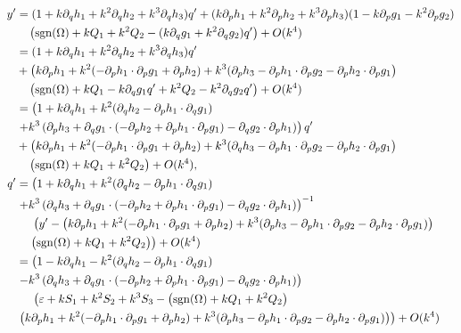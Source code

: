 \documentclass[../main]{subfiles}
\begin{document}
    \begin{align}
        y'&=(1+k\partial_q h_1+k^2\partial_q h_2+k^3\partial_q h_3)q'+(k\pt_p h_1+k^2\pt_p h_2+k^3\pt_p h_3)(1-k\pt_p g_1-k^2\pt_p g_2)\notag\\
        &\quad\left(\operatorname{sgn}(\Omega)+kQ_1+k^2 Q_2-(k\pt_q g_1+k^2\pt_q g_2)q'\right)+O(k^4)\\
        &=(1+k\partial_q h_1+k^2\partial_q h_2+k^3\partial_q h_3)q'\notag\\
        &+\left(k\pt_p h_1+k^2(-\pt_p h_1\cdot \pt_p g_1+\pt_p h_2)+k^3(\pt_p h_3-\pt_p h_1\cdot\pt_p g_2-\pt_p h_2\cdot \pt_p g_1\right)\notag\\
        &\quad\left(\operatorname{sgn}(\Omega)+kQ_1-k\pt_q g_1q'+k^2Q_2-k^2\pt_q g_2q'\right)+O(k^4)\\
        &=\left(1+k\partial_q h_1+k^2(\partial_q h_2-\pt_p h_1\cdot \pt_q g_1)\right.\notag\\
        &\left.+k^3\left(\pt_p h_3+\pt_qg_1\cdot(-\pt_ph_2+\pt_ph_1\cdot\pt_pg_1)-\pt_qg_2\cdot\pt_ph_1\right)\right)q'\notag\\
        &+\left(k\pt_p h_1+k^2(-\pt_p h_1\cdot \pt_p g_1+\pt_p h_2)+k^3(\pt_q h_3-\pt_p h_1\cdot\pt_p g_2-\pt_p h_2\cdot \pt_p g_1\right)\notag\\
        &\quad\left(\operatorname{sgn}(\Omega)+kQ_1+k^2Q_2\right)+O(k^4),\\
        q'&=\left(1+k\partial_q h_1+k^2(\partial_q h_2-\pt_p h_1\cdot \pt_q g_1)\right.\notag\\
        &\left.+k^3\left(\pt_q h_3+\pt_qg_1\cdot(-\pt_ph_2+\pt_ph_1\cdot\pt_pg_1)-\pt_qg_2\cdot\pt_ph_1\right)\right)^{-1}\notag\\
        &\quad\ \left(y'-\left(k\pt_p h_1+k^2(-\pt_p h_1\cdot \pt_p g_1+\pt_p h_2)+k^3(\pt_p h_3-\pt_p h_1\cdot\pt_p g_2-\pt_p h_2\cdot \pt_p g_1)\right)\right.\notag\\
        &\quad\left. \left(\operatorname{sgn}(\Omega)+kQ_1+k^2Q_2\right)\right)+O(k^4)\\
        &=\left(1-k\partial_q h_1-k^2(\partial_q h_2-\pt_p h_1\cdot \pt_q g_1)\right.\notag\\
        &\left.-k^3\left(\pt_q h_3+\pt_qg_1\cdot(-\pt_ph_2+\pt_ph_1\cdot\pt_pg_1)-\pt_qg_2\cdot\pt_ph_1\right)\right)\notag\\
        &\quad\ \left(\varepsilon +kS_1+k^2S_2+k^3S_3-\left(\operatorname{sgn}(\Omega)+kQ_1+k^2Q_2\right)\right.\notag\\
        &\left.\left(k\pt_p h_1+k^2(-\pt_p h_1\cdot \pt_p g_1+\pt_p h_2)+k^3(\pt_p h_3-\pt_p h_1\cdot\pt_p g_2-\pt_p h_2\cdot \pt_p g_1)\right)\right)+O(k^4)\\

\end{align}
\end{document}
